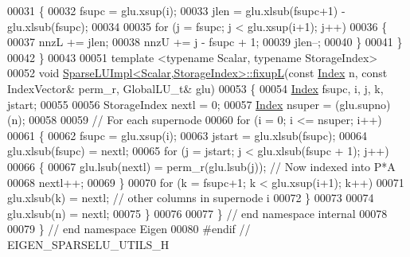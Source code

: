 \begin{DoxyCode}
00031  \{
00032    fsupc = glu.xsup(i); 
00033    jlen = glu.xlsub(fsupc+1) - glu.xlsub(fsupc); 
00034    
00035    \textcolor{keywordflow}{for} (j = fsupc; j < glu.xsup(i+1); j++)
00036    \{
00037      nnzL += jlen; 
00038      nnzU += j - fsupc + 1; 
00039      jlen--; 
00040    \}
00041  \}
00042 \}
00043 
00051 \textcolor{keyword}{template} <\textcolor{keyword}{typename} Scalar, \textcolor{keyword}{typename} StorageIndex>
00052 \textcolor{keywordtype}{void} \hyperlink{group___sparse_l_u___module_ae1d1ed091956ff4e5734b4e3f79f866e}{SparseLUImpl<Scalar,StorageIndex>::fixupL}(\textcolor{keyword}{const} 
      \hyperlink{namespace_eigen_a62e77e0933482dafde8fe197d9a2cfde}{Index} n, \textcolor{keyword}{const} IndexVector& perm\_r, GlobalLU\_t& glu)
00053 \{
00054   \hyperlink{namespace_eigen_a62e77e0933482dafde8fe197d9a2cfde}{Index} fsupc, i, j, k, jstart; 
00055   
00056   StorageIndex nextl = 0; 
00057   \hyperlink{namespace_eigen_a62e77e0933482dafde8fe197d9a2cfde}{Index} nsuper = (glu.supno)(n); 
00058   
00059   \textcolor{comment}{// For each supernode }
00060   \textcolor{keywordflow}{for} (i = 0; i <= nsuper; i++)
00061   \{
00062     fsupc = glu.xsup(i); 
00063     jstart = glu.xlsub(fsupc); 
00064     glu.xlsub(fsupc) = nextl; 
00065     \textcolor{keywordflow}{for} (j = jstart; j < glu.xlsub(fsupc + 1); j++)
00066     \{
00067       glu.lsub(nextl) = perm\_r(glu.lsub(j)); \textcolor{comment}{// Now indexed into P*A}
00068       nextl++;
00069     \}
00070     \textcolor{keywordflow}{for} (k = fsupc+1; k < glu.xsup(i+1); k++)
00071       glu.xlsub(k) = nextl; \textcolor{comment}{// other columns in supernode i}
00072   \}
00073   
00074   glu.xlsub(n) = nextl; 
00075 \}
00076 
00077 \} \textcolor{comment}{// end namespace internal}
00078 
00079 \} \textcolor{comment}{// end namespace Eigen}
00080 \textcolor{preprocessor}{#endif // EIGEN\_SPARSELU\_UTILS\_H}
\end{DoxyCode}
